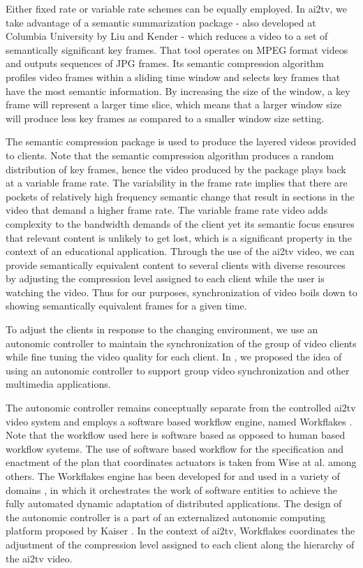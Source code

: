 \documentclass{sig-alternate}
\begin{document}
Either fixed rate or variable rate schemes can be equally employed. In
ai2tv, we take advantage of a semantic summarization package - also
developed at Columbia University by Liu and Kender \cite{TIECHENG} -
which reduces a video to a set of semantically significant key frames.
That tool operates on MPEG format videos and outputs sequences of JPG
frames.  Its semantic compression algorithm profiles video frames
within a sliding time window and selects key frames that have the most
semantic information.  By increasing the size of the window, a key
frame will represent a larger time slice, which means that a larger
window size will produce less key frames as compared to a smaller
window size setting.  

The semantic compression package is used to produce the layered videos
provided to clients.  Note that the semantic compression algorithm
produces a random distribution of key frames, hence the video produced
by the package plays back at a variable frame rate.  The variability
in the frame rate implies that there are pockets of relatively high
frequency semantic change that result in sections in the video that
demand a higher frame rate.  The variable frame rate video adds
complexity to the bandwidth demands of the client yet its semantic
focus ensures that relevant content is unlikely to get lost, which is
a significant property in the context of an educational application.
Through the use of the ai2tv video, we can provide semantically
equivalent content to several clients with diverse resources by
adjusting the compression level assigned to each client while the user
is watching the video.  Thus for our purposes, synchronization of
video boils down to showing semantically equivalent frames for a given
time.

To adjust the clients in response to the changing environment, we use
an autonomic controller to maintain the synchronization of the group
of video clients while fine tuning the video quality for each client.
In \cite{RAVAGES}, we proposed the idea of using an autonomic controller
to support group video synchronization and other multimedia
applications.

The autonomic controller remains conceptually separate from the
controlled ai2tv video system and employs a software based workflow
engine, named Workflakes \cite{PEPPO}.  Note that the workflow used
here is software based as opposed to human based workflow systems.
The use of software based workflow for the specification and enactment
of the plan that coordinates actuators is taken from Wise at
al. \cite{OSTERWEIL} among others.  The Workflakes engine has been
developed for and used in a variety of domains \cite{AMS,ICSE}, in
which it orchestrates the work of software entities to achieve the
fully automated dynamic adaptation of distributed applications.  The
design of the autonomic controller is a part of an externalized
autonomic computing platform proposed by Kaiser \cite{REFARCH}.  In
the context of ai2tv, Workflakes coordinates the adjustment of the
compression level assigned to each client along the hierarchy of the
ai2tv video.
\end{document}
